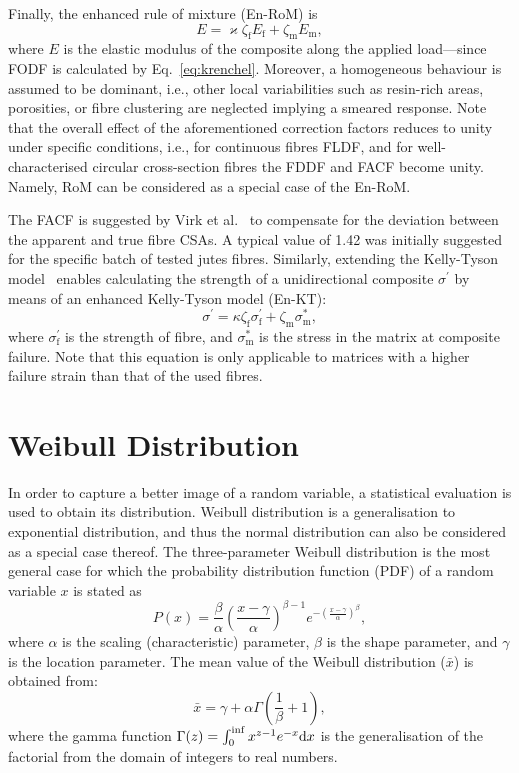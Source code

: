 	Finally, the enhanced rule of mixture (En-RoM) is~\autocite{Summerscales.2013} 
	\begin{equation}
		E = \varkappa \zeta_\text{f}E_\text{f}+\zeta_\text{m}E_\text{m},\label{eq:enrom}
	\end{equation}
	where $E$ is the elastic modulus of the composite along the applied load---since FODF is calculated by Eq.~\eqref{eq:krenchel}. Moreover, a homogeneous behaviour is assumed to be dominant, i.e., other local variabilities such as resin-rich areas, porosities, or fibre clustering are neglected implying a smeared response. Note that the overall effect of the aforementioned correction factors reduces to unity under specific conditions, i.e., for continuous fibres FLDF, and for well-characterised circular cross-section fibres the FDDF and FACF become unity. Namely, RoM can be considered as a special case of the En-RoM.
	
	The FACF is suggested by Virk et al.~\autocite{Virk.2009} to compensate for the deviation between the apparent and true fibre CSAs. A typical value of 1.42 was initially suggested for the specific batch of tested jutes fibres. Similarly, extending the Kelly-Tyson model~\autocite{Kelly.1965} enables calculating the strength of a unidirectional composite $\sigma^\prime$ by means of an enhanced Kelly-Tyson model (En-KT):
	\begin{equation}
		\sigma^\prime = \kappa \zeta_\text{f}\sigma^\prime_\text{f}+\zeta_\text{m}\sigma^*_\text{m},\label{eq:en-KT}
	\end{equation}
	where $\sigma^\prime_\text{f}$ is the strength of fibre, and $\sigma^*_\text{m}$ is the stress in the matrix at composite failure. Note that this equation is only applicable to matrices with a higher failure strain than that of the used fibres.

\section{Weibull Distribution}
	In order to capture a better image of a random variable, a statistical evaluation is used to obtain its distribution. Weibull distribution is a generalisation to exponential distribution, and thus the normal distribution can also be considered as a special case thereof. The three-parameter Weibull distribution is the most general case for which the probability distribution function (PDF) of a random variable $x$ is stated as
    \begin{equation}
    	P(x)=\frac{\beta}{\alpha}\left(\frac{x-\gamma}{\alpha}\right)^{\beta-1}e^{-\left(\frac{x-\gamma}{\alpha}\right)^\beta},
    \end{equation}
    where $\alpha$ is the scaling (characteristic) parameter, $\beta$ is the shape parameter, and $\gamma$ is the location parameter. The mean value of the Weibull distribution ($\bar{x}$) is obtained from:
    \begin{equation}
       	\bar{x}=\gamma +\alpha \Gamma\left(\frac{1}{\beta}+1\right), \label{eq:strength}
    \end{equation}
    where the gamma function $\Gamma(z)=\int_{0}^{\inf}x^{z-1}e^{-x}\text{d} x$ is the generalisation of the factorial from the domain of integers to real numbers.

